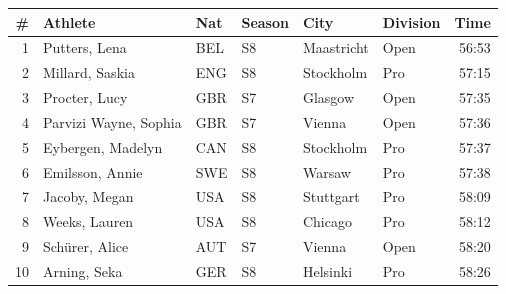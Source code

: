 \begin{tabular}{rlllllr}
\toprule
\multicolumn{1}{r}{\textbf{\#}} & \textbf{Athlete} & \textbf{Nat} & \textbf{Season} & \textbf{City} & \textbf{Division} & \multicolumn{1}{r}{\textbf{Time}} \\
\midrule
1 & Putters, Lena & BEL & S8 & Maastricht & Open & 56:53 \\
2 & Millard, Saskia & ENG & S8 & Stockholm & Pro & 57:15 \\
3 & Procter, Lucy & GBR & S7 & Glasgow & Open & 57:35 \\
4 & Parvizi Wayne, Sophia & GBR & S7 & Vienna & Open & 57:36 \\
5 & Eybergen, Madelyn & CAN & S8 & Stockholm & Pro & 57:37 \\
6 & Emilsson, Annie & SWE & S8 & Warsaw & Pro & 57:38 \\
7 & Jacoby, Megan & USA & S8 & Stuttgart & Pro & 58:09 \\
8 & Weeks, Lauren & USA & S8 & Chicago & Pro & 58:12 \\
9 & Schürer, Alice & AUT & S7 & Vienna & Open & 58:20 \\
10 & Arning, Seka & GER & S8 & Helsinki & Pro & 58:26 \\
\bottomrule
\end{tabular}